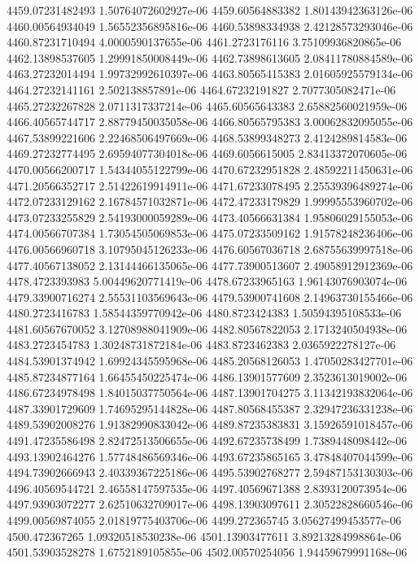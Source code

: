 {4459.07231482493 1.50764072602927e-06
4459.60564883382 1.80143942363126e-06
4460.00564934049 1.56552356895816e-06
4460.53898334938 2.42128573293046e-06
4460.87231710494 4.0000590137655e-06
4461.2723176116 3.75109936820865e-06
4462.13898537605 1.29991850008449e-06
4462.73898613605 2.08411780884589e-06
4463.27232014494 1.99732992610397e-06
4463.80565415383 2.01605925579134e-06
4464.27232141161 2.502138857891e-06
4464.67232191827 2.7077305082471e-06
4465.27232267828 2.0711317337214e-06
4465.60565643383 2.65882560021959e-06
4466.40565744717 2.88779450035058e-06
4466.80565795383 3.00062832095055e-06
4467.53899221606 2.22468506497669e-06
4468.53899348273 2.4124289814583e-06
4469.27232774495 2.69594077304018e-06
4469.6056615005 2.83413372070605e-06
4470.00566200717 1.54344055122799e-06
4470.67232951828 2.48592211450631e-06
4471.20566352717 2.51422619914911e-06
4471.67233078495 2.25539396489274e-06
4472.07233129162 2.16784571032871e-06
4472.47233179829 1.99995553960702e-06
4473.07233255829 2.54193000059289e-06
4473.40566631384 1.95806029155053e-06
4474.00566707384 1.73054505069853e-06
4475.07233509162 1.91578248236406e-06
4476.00566960718 3.10795045126233e-06
4476.60567036718 2.68755639997518e-06
4477.40567138052 2.13144466135065e-06
4477.73900513607 2.49058912912369e-06
4478.4723393983 5.00449620771419e-06
4478.67233965163 1.96143076903074e-06
4479.33900716274 2.55531103569643e-06
4479.53900741608 2.14963730155466e-06
4480.2723416783 1.58544359770942e-06
4480.8723424383 1.50594395108533e-06
4481.60567670052 3.12708988041909e-06
4482.80567822053 2.1713240504938e-06
4483.2723454783 1.30248731872184e-06
4483.8723462383 2.0365922278127e-06
4484.53901374942 1.69924345595968e-06
4485.20568126053 1.47050283427701e-06
4485.87234877164 1.66455450225474e-06
4486.13901577609 2.3523613019002e-06
4486.67234978498 1.84015037750564e-06
4487.13901704275 3.11342193832064e-06
4487.33901729609 1.74695295144828e-06
4487.80568455387 2.32947236331238e-06
4489.53902008276 1.91382990833042e-06
4489.87235383831 3.15926591018457e-06
4491.47235586498 2.82472513506655e-06
4492.67235738499 1.7389448098442e-06
4493.13902464276 1.57748486569346e-06
4493.67235865165 3.47848407044599e-06
4494.73902666943 2.40339367225186e-06
4495.53902768277 2.59487153130303e-06
4496.40569544721 2.46558147597535e-06
4497.40569671388 2.8393120073954e-06
4497.93903072277 2.62510632709017e-06
4498.13903097611 2.30522828660546e-06
4499.00569874055 2.01819775403706e-06
4499.272365745 3.05627499453577e-06
4500.472367265 1.09320518530238e-06
4501.13903477611 3.89213284998864e-06
4501.53903528278 1.6752189105855e-06
4502.00570254056 1.94459679991168e-06
}
